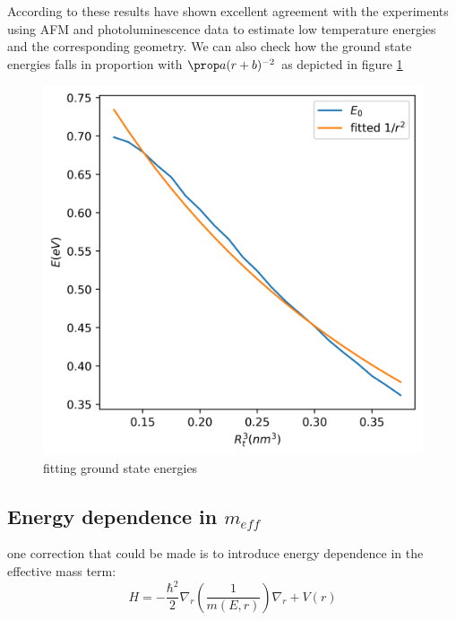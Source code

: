 \documentclass[twoside,11pt]{article}
\begin{document}
        According to \cite{marzin1994calculation} these results have shown excellent agreement with the experiments using AFM and photoluminescence data to estimate low temperature energies and the corresponding geometry. We can also check how the ground state energies falls in proportion with $\prop a(r+b)^{-2}$ as depicted in figure \ref{fig: fitting}
        \begin{figure}[h]
            \centering
            \includegraphics[scale = 0.5]{fit.png}
            \caption{fitting ground state energies}
            \label{fig: fitting}
        \end{figure}

    
    \subsection{Energy dependence in $m_{eff}$}

    one correction that could be made is to introduce energy dependence in the effective mass term:
    \begin{equation}
        H = -\frac{\hbar^2}{2}\nabla_r\left(\frac{1}{m(E, r)}\right)\nabla_r + V(r)
        \label{energy dependant mass schrodinger equation}
    \end{equation}
\end{document}
